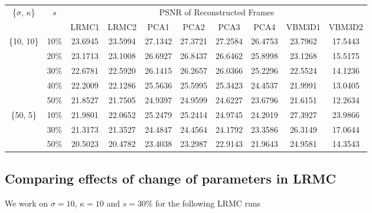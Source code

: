 \documentclass[fleqn, 11pt]{article}
\begin{document}
\begin{table}[H]
    \centering
    \begin{tabular}{||c|c||c|c||c|c|c|c||c|c||}
         \hline
         \multirow{2}{*}{\{$\sigma$, $\kappa$\}} & \multirow{2}{*}{$s$} & \multicolumn{8}{c||}{PSNR of Reconstructed Frames} \\
         \cline{3-10}
         & & LRMC1 & LRMC2 & PCA1 & PCA2 & PCA3 & PCA4 & VBM3D1 & VBM3D2 \\
         \hline
         \multirow{5}{*}{\{10, 10\}} & 10\% & 23.6945 & 23.5994 & 27.1342 & 27.3721 & 27.2584 & 26.4753 & 23.7962 & 17.5443 \\
         \cline{2-10}
          & 20\% & 23.1713 & 23.1008 & 26.6927 & 26.8437 & 26.6462 & 25.8998 & 23.1268 & 15.5175 \\
         \cline{2-10}
          & 30\% & 22.6781 & 22.5920 & 26.1415 & 26.2657 & 26.0366 & 25.2296 & 22.5524 & 14.1236 \\
         \cline{2-10}
          & 40\% & 22.2009 & 22.1286 & 25.5636 & 25.5995 & 25.3423 & 24.4537 & 21.9991 & 13.0405 \\
         \cline{2-10}
          & 50\% & 21.8527 & 21.7505 & 24.9397 & 24.9599 & 24.6227 & 23.6796 & 21.6151 & 12.2634 \\
         \hline
         \multirow{3}{*}{\{50, 5\}} & 10\% & 21.9801 & 22.0652 & 25.2479 & 25.2414 & 24.9745 & 24.2019 & 27.3927 & 23.9866 \\
         \cline{2-10}
          & 30\% & 21.3173 & 21.3527 & 24.4847 & 24.4564 & 24.1792 & 23.3586 & 26.3149 & 17.0644 \\
         \cline{2-10}
          & 50\% & 20.5023 & 20.4782 & 23.4038 & 23.2987 & 22.9143 & 21.9643 & 24.9581 & 14.3543 \\
         \hline
    \end{tabular}
\end{table}

\subsection*{Comparing effects of change of parameters in LRMC}

We work on $\sigma = 10$, $\kappa = 10$ and $s = 30\%$ for the following LRMC runs
\end{document}

